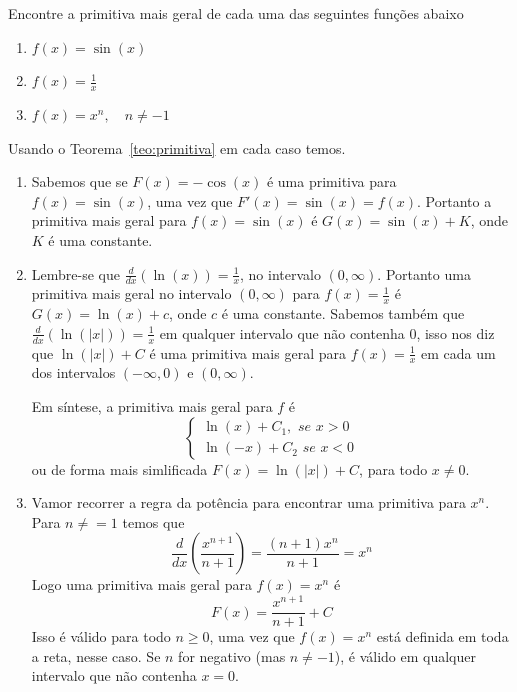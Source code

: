 \begin{example}
  Encontre a primitiva mais geral de cada uma das seguintes funções abaixo
  \begin{enumerate}[label=\alph*)]
    \item \(f(x)= \sin(x)\)
    \item \(f(x)= \frac{1}{x}\)
    \item \(f(x)= x^n, \quad n \neq -1\)
  \end{enumerate}

  \solution
  Usando o Teorema~\ref{teo:primitiva} em cada caso temos.
  \begin{enumerate}[label=\alph*)]
    \item
    Sabemos que se $F(x)=-\cos(x)$ é uma primitiva para $f(x)= \sin(x)$,
    uma vez que $F'(x)=\sin(x)=f(x)$. Portanto a primitiva mais geral
    para $f(x)= \sin(x)$ é $G(x)= \sin(x)+K$, onde $K$ é uma constante.
    \item
    Lembre-se que $\frac{d}{dx} (\ln(x))=\frac{1}{x}$, no intervalo
    $(0, \infty)$.
    Portanto uma primitiva mais geral no intervalo $(0,\infty)$
    para $f(x)=\frac{1}{x}$ é $G(x)=\ln(x)+c$, onde $c$ é uma constante.
    Sabemos também que $\frac{d}{dx}(\ln(\vert x\vert))= \frac{1}{x}$ em
    qualquer intervalo que não contenha  $0$, isso nos diz que
    $\ln(\vert x \vert)+ C$ é uma primitiva mais geral para
    $f(x)= \frac{1}{x}$ em cada um dos intervalos $(-\infty,0)$ e
    $(0, \infty)$.

    Em síntese, a primitiva mais geral para $f$ é
    \[
    \left\{\begin{array}{ll} \ln(x)+ C_1, \,\, se \,\, x>0\\
      \ln(-x)+ C_2 \,\, se \,\, x<0\end{array}\right.
    \]
    ou de forma mais simlificada $F(x)=\ln(\vert x \vert )+ C$,
    para todo $x \neq 0$.
    \item
    Vamor recorrer a regra da potência para encontrar uma primitiva para $x^n$.
    Para $n \neq =1$ temos que
    \[
    \frac{d}{dx} \left( \frac{x^{n+1}}{n+1}\right)
    = \frac{(n+1)x^n}{n+1}=x^n
    \]
    Logo uma primitiva mais geral para $f(x)=x^n$ é
    \[
    F(x)=\frac{x^{n+1}}{n+1}+ C
    \]
    Isso é válido para todo $n \geq 0$, uma vez que $f(x)=x^n$ está
    definida em toda a reta, nesse caso. Se $n$ for negativo
    (mas $n \neq -1$), é válido em qualquer intervalo que não contenha $x=0$.
  \end{enumerate}
\end{example}

